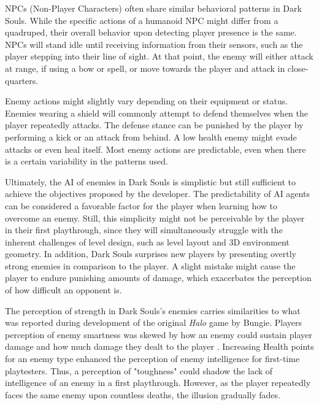 NPCs (Non-Player Characters) often share similar behavioral patterns in Dark Souls. While the specific actions of a humanoid NPC might differ from a quadruped, their overall behavior upon detecting player presence is the same. NPCs will stand idle until receiving information from their sensors, such as the player stepping into their line of sight. At that point, the enemy will either attack at range, if using a bow or spell, or move towards the player and attack in close-quarters.

Enemy actions might slightly vary depending on their equipment or status. Enemies wearing a shield will commonly attempt to defend themselves when the player repeatedly attacks. The defense stance can be punished by the player by performing a kick or an attack from behind. A low health enemy might evade attacks or even heal itself. Most enemy actions are predictable, even when there is a certain variability in the patterns used.

Ultimately, the AI of enemies in Dark Souls is simplistic but still sufficient to achieve the objectives proposed by the developer. The predictability of AI agents can be considered a favorable factor for the player when learning how to overcome an enemy. Still, this simplicity might not be perceivable by the player in their first playthrough, since they will simultaneously struggle with the inherent challenges of level design, such as level layout and 3D environment geometry. In addition, Dark Souls surprises new players by presenting overtly strong enemies in comparison to the player. A slight mistake might cause the player to endure punishing amounts of damage, which exacerbates the perception of how difficult an opponent is.

The perception of strength in Dark Souls's enemies carries similarities to what was reported during development of the original \emph{Halo} game by Bungie. Players perception of enemy smartness was skewed by how an enemy could sustain player damage and how much damage they dealt to the player . Increasing Health points for an enemy type enhanced the perception of enemy intelligence for first-time playtesters. Thus, a perception of "toughness" could shadow the lack of intelligence of an enemy in a first playthrough. However, as the player repeatedly faces the same enemy upon countless deaths, the illusion gradually fades.

